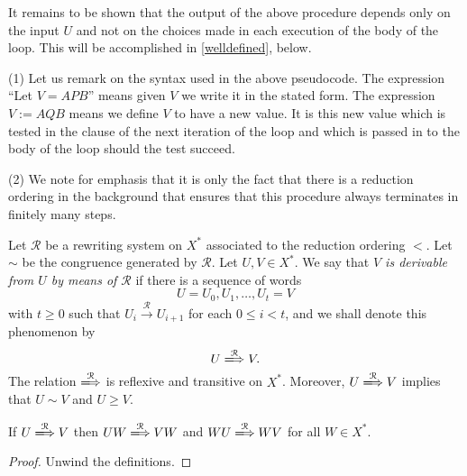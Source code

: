 \begin{ap}
\begin{algorithm}
\begin{algorithmic}[1]
    \EndProcedure
\end{algorithmic}
\end{algorithm}

    It remains to be shown that the output of the above procedure depends only
    on the input $U$ and not on the choices made in each execution of the body
    of the loop. This will be accomplished in \ref{welldefined}, below.
\end{ap}

\begin{rems} (1) Let us remark on the syntax used in the above pseudocode. The
    expression ``Let $V=APB$'' means given $V$ we write it in the stated form.
    The expression $V := AQB$ means we define $V$ to have a new value. It is
    this new value which is tested in the clause of the next iteration of the
    loop and which is passed in to the body of the loop should the test
    succeed.

    (2) We note for emphasis that it is only the fact that there is a reduction
    ordering in the background that ensures that this procedure always
    terminates in finitely many steps.
\end{rems}

\begin{defn} Let $\mathcal{R}$ be a rewriting system on $X^*$ associated to the
    reduction ordering $<$. Let $\sim$ be the congruence generated by
    $\mathcal{R}$. Let $U,V \in X^*$. We say that \emph{$V$ is derivable from
    $U$ by means of $\mathcal{R}$} if there is a sequence of words \[U =
    U_0, U_1, \dots, U_t = V\] with $t\ge 0$ such that $U_i
    \xrightarrow{\mathcal{R}} U_{i+1}$ for each $0 \le i < t$, and we shall
    denote this phenomenon by \[U \xLongrightarrow{\mathcal{R}} V. \] The
    relation $\xLongrightarrow{\mathcal{R}}$ is reflexive and transitive on
    $X^*$. Moreover, $U \xLongrightarrow{\mathcal{R}} V$ implies that
    $U\sim V$ and $U \ge V$.
\end{defn}

\begin{prop} If $U \xLongrightarrow{\mathcal{R}} V$ then $UW
    \xLongrightarrow{\mathcal{R}} VW$ and $WU \xLongrightarrow{\mathcal{R}} WV$
    for all $W \in X^*$.
\end{prop}
\begin{proof} Unwind the definitions.
\end{proof}

